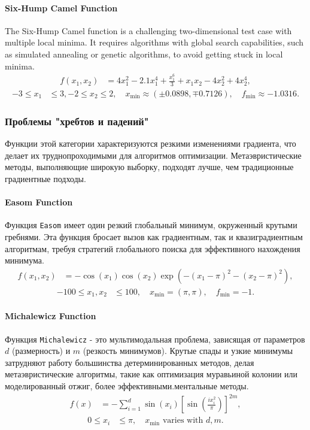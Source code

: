 \documentclass[10pt]{article}
\begin{document}
\paragraph{Six-Hump Camel Function}
The Six-Hump Camel function is a challenging two-dimensional test case with multiple local minima. It requires algorithms with global search capabilities, such as simulated annealing or genetic algorithms, to avoid getting stuck in local minima.
\begin{align}
    f(x_1, x_2) &= 4x_1^2 - 2.1x_1^4 + \frac{x_1^6}{3} + x_1x_2 - 4x_2^2 + 4x_2^4,
    \label{eq:6camel}
\end{align}        
\begin{align*}
    -3 \leq x_1 &\leq 3, -2 \leq x_2 \leq 2, \quad x_{\text{min}} \approx (\pm 0.0898, \mp 0.7126), \quad f_{\text{min}} \approx -1.0316.
\end{align*}

\subsubsection{Проблемы "хребтов и падений"}
Функции этой категории характеризуются резкими изменениями градиента, что делает их труднопроходимыми для алгоритмов оптимизации. Метаэвристические методы, выполняющие широкую выборку, подходят лучше, чем традиционные градиентные подходы.

\paragraph{Easom Function}
Функция \texttt{Easom} имеет один резкий глобальный минимум, окруженный крутыми гребнями. Эта функция бросает вызов как градиентным, так и квазиградиентным алгоритмам, требуя стратегий глобального поиска для эффективного нахождения минимума.
\begin{align}
    f(x_1, x_2) &= -\cos(x_1) \cos(x_2) \exp\left(-(x_1 - \pi)^2 - (x_2 - \pi)^2\right), 
    \label{eq:easom}
\end{align}
\begin{align*}
    -100 \leq x_1, x_2 &\leq 100, \quad x_{\text{min}} = (\pi, \pi), \quad f_{\text{min}} = -1.   
\end{align*}


\paragraph{Michalewicz Function}
Функция \texttt{Michalewicz} - это мультимодальная проблема, зависящая от параметров $d$ (размерность) и $m$ (резкость минимумов). Крутые спады и узкие минимумы затрудняют работу большинства детерминированных методов, делая метаэвристические алгоритмы, такие как оптимизация муравьиной колонии или моделированный отжиг, более эффективными.ментальные методы.
\begin{align}
    f(x) &= -\sum_{i=1}^d \sin(x_i) \left[\sin\left(\frac{i x_i^2}{\pi}\right)\right]^{2m},
    \label{eq:mich}
\end{align}
\begin{align*}
    0 \leq x_i &\leq \pi, \quad x_{\text{min}} \text{ varies with } d, m.
\end{align*}
\end{document}
